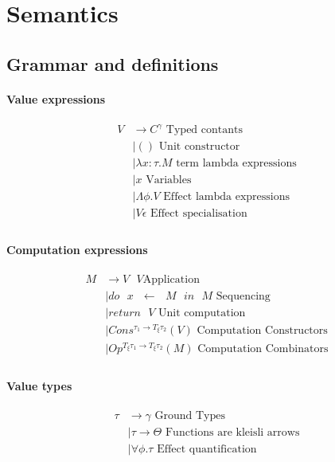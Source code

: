 \documentclass[twoside,a4paper,11pt]{article}
\newcommand{\s}{\mbox{ }}
\begin{document}
\section{Semantics}
\subsection{Grammar and definitions}

\paragraph{Value expressions}

\begin{equation}
\label{PDefifinition}
\begin{split}
V  &\rightarrow C^{\gamma} \mbox{ Typed contants}\\
&\mid () \mbox{ Unit constructor}\\
&\mid \lambda x: \tau. M \mbox{ term lambda expressions}\\
&\mid x \mbox{ Variables}\\
&\mid \Lambda \phi. V \mbox{ Effect lambda expressions}\\
&\mid V \epsilon \mbox{ Effect specialisation}\\
\end{split}
\end{equation} 

\paragraph{Computation expressions}
\begin{equation}
\label{PDefifinition}
\begin{split}
M & \rightarrow V \s V \mbox{Application}\\
&\mid do \s x \s \leftarrow \s M \s in \s M \mbox{ Sequencing}\\
&\mid return\s V \mbox{ Unit computation}\\
&\mid Cons^{\tau_1 \rightarrow T_{\xi} \tau_2}(V) \mbox{ Computation Constructors}\\
&\mid Op^{T_{\xi} \tau_1 \rightarrow T_{\xi} \tau_2}(M) \mbox{ Computation Combinators}\\
\end{split}
\end{equation} 

\paragraph{Value types}
\begin{equation}
\label{PDefifinition}
\begin{split}
\tau & \rightarrow \gamma \mbox{ Ground Types}\\
&\mid \tau \rightarrow \Theta \mbox{ Functions are kleisli arrows}\\
&\mid \forall \phi. \tau \mbox{ Effect quantification}\\
\end{split}
\end{equation} 
\end{document}
